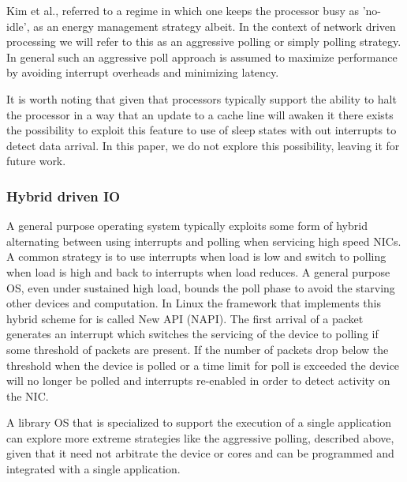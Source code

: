 Kim et al.\cite{pacingtoidle}, referred to a regime in which one keeps the processor busy as 'no-idle', as an energy management strategy albeit.   In the context of network driven processing we will refer to this as an aggressive polling or simply polling strategy.    In general such an aggressive poll approach is assumed to maximize performance by avoiding interrupt overheads and minimizing latency. 

It is worth noting that given that processors typically support the ability to halt the processor in a way that an update to a cache line will awaken it there exists the possibility to exploit this feature to use of sleep states with out interrupts to detect data arrival.  In this paper, we do not explore this possibility, leaving it for future work.   

\subsubsection{Hybrid driven IO}
\label{sec:workflow:hybridio}
A general purpose operating system typically exploits some form of hybrid alternating between using interrupts and polling when servicing high speed NICs. A common strategy is to use interrupts when load is low and switch to polling when load is high and back to interrupts when load reduces.  A general purpose OS, even under sustained high load, bounds the poll phase to avoid the starving  other devices and computation.  In Linux the framework that implements this hybrid scheme for is called New API (NAPI)\cite{NAPI}.  The first arrival of a packet generates an interrupt which switches the servicing of the device to polling if some threshold of packets are present.  If the number of packets drop below the threshold when the device is polled or a time limit for poll is exceeded the device will no longer be polled and interrupts re-enabled in order to detect activity on the NIC.  

A library OS that is specialized to support the execution of a single application can explore more extreme strategies like the aggressive polling, described above, given that it need not arbitrate the device or cores and can be programmed and integrated with a single application.  

